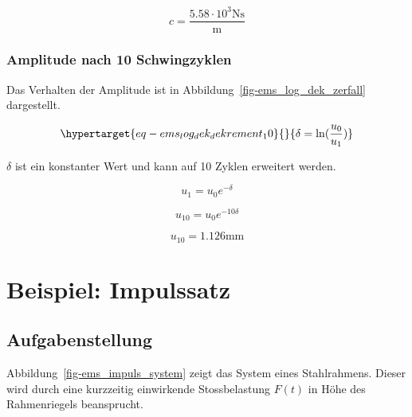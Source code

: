 \documentclass[
  letterpaper,
  DIV=11]{scrreprt}
\begin{document}
\begin{equation}c = \frac{5.58 \cdot 10^{3} \text{N} \text{s}}{\text{m}}\end{equation}

\hypertarget{amplitude-nach-10-schwingzyklen}{%
\subsection{Amplitude nach 10
Schwingzyklen}\label{amplitude-nach-10-schwingzyklen}}

Das Verhalten der Amplitude ist in
Abbildung~\ref{fig-ems_log_dek_zerfall} dargestellt.

\begin{equation}\protect\hypertarget{eq-ems_log_dek_dekrement_10}{}{
\delta = \ln({\frac{u_0}{u_1}})
}\label{eq-ems_log_dek_dekrement_10}\end{equation}

\(\delta\) ist ein konstanter Wert und kann auf 10 Zyklen erweitert
werden.

\begin{equation}u_{1} = u_{0} e^{- \delta}\end{equation}

\begin{equation}u_{10} = u_{0} e^{- 10 \delta}\end{equation}

\begin{equation}u_{10} = 1.126 \text{mm}\end{equation}

\hypertarget{beispiel-impulssatz}{%
\chapter{Beispiel: Impulssatz}\label{beispiel-impulssatz}}

\hypertarget{aufgabenstellung-4}{%
\section{Aufgabenstellung}\label{aufgabenstellung-4}}

Abbildung~\ref{fig-ems_impuls_system} zeigt das System eines
Stahlrahmens. Dieser wird durch eine kurzzeitig einwirkende
Stossbelastung \(F(t)\) in Höhe des Rahmenriegels beansprucht.
\end{document}
